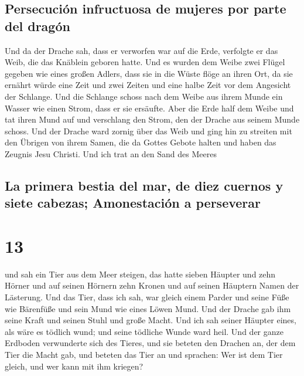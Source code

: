 \hypertarget{persecuciuxf3n-infructuosa-de-mujeres-por-parte-del-draguxf3n}{%
\subsection{Persecución infructuosa de mujeres por parte del
dragón}\label{persecuciuxf3n-infructuosa-de-mujeres-por-parte-del-draguxf3n}}

 Und da der Drache sah, dass er verworfen war auf die
Erde, verfolgte er das Weib, die das Knäblein geboren hatte.
 Und es wurden dem Weibe zwei Flügel gegeben wie eines
großen Adlers, dass sie in die Wüste flöge an ihren Ort, da sie ernährt
würde eine Zeit und zwei Zeiten und eine halbe Zeit vor dem Angesicht
der Schlange.  Und die Schlange schoss nach dem Weibe aus
ihrem Munde ein Wasser wie einen Strom, dass er sie ersäufte.
 Aber die Erde half dem Weibe und tat ihren Mund auf und
verschlang den Strom, den der Drache aus seinem Munde schoss.
 Und der Drache ward zornig über das Weib und ging hin zu
streiten mit den Übrigen von ihrem Samen, die da Gottes Gebote halten
und haben das Zeugnis Jesu Christi.  Und ich trat an den
Sand des Meeres

\hypertarget{la-primera-bestia-del-mar-de-diez-cuernos-y-siete-cabezas-amonestaciuxf3n-a-perseverar}{%
\subsection{La primera bestia del mar, de diez cuernos y siete cabezas;
Amonestación a
perseverar}\label{la-primera-bestia-del-mar-de-diez-cuernos-y-siete-cabezas-amonestaciuxf3n-a-perseverar}}

\hypertarget{section-12}{%
\section{13}\label{section-12}}

 und sah ein Tier aus dem Meer steigen, das hatte sieben
Häupter und zehn Hörner und auf seinen Hörnern zehn Kronen und auf
seinen Häuptern Namen der Lästerung.  Und das Tier, dass
ich sah, war gleich einem Parder und seine Füße wie Bärenfüße und sein
Mund wie eines Löwen Mund. Und der Drache gab ihm seine Kraft und seinen
Stuhl und große Macht.  Und ich sah seiner Häupter eines,
als wäre es tödlich wund; und seine tödliche Wunde ward heil. Und der
ganze Erdboden verwunderte sich des Tieres,  und sie
beteten den Drachen an, der dem Tier die Macht gab, und beteten das Tier
an und sprachen: Wer ist dem Tier gleich, und wer kann mit ihm kriegen?

